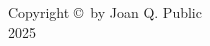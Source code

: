 \thispagestyle{empty}
       \vspace*{15\baselineskip}


\begin{center}
Copyright \copyright\ by Joan Q. Public\\
2025
\end{center}

\newpage
